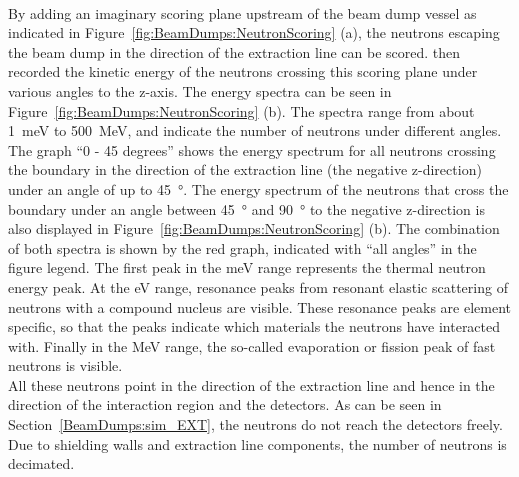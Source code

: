 \\By adding an imaginary scoring plane upstream of the beam dump vessel as indicated in Figure~\ref{fig:BeamDumps:NeutronScoring} (a), the neutrons escaping the beam dump in the direction of the extraction line can be scored.
\fluka then recorded the kinetic energy of the neutrons crossing this scoring plane under various angles to the z-axis.
The energy spectra can be seen in Figure~\ref{fig:BeamDumps:NeutronScoring} (b).
The spectra range from about \SI{1}{\meV} to \SI{500}{\MeV}, and indicate the number of neutrons under different angles. 
The graph ``0 - 45 degrees'' shows the energy spectrum for all neutrons crossing the boundary in the direction of the extraction line (the negative z-direction) under an angle of up to \SI{45}{\degree}.
The energy spectrum of the neutrons that cross the boundary under an angle between \SI{45}{\degree} and \SI{90}{\degree} to the negative z-direction is also displayed in Figure~\ref{fig:BeamDumps:NeutronScoring} (b).
The combination of both spectra is shown by the red graph, indicated with ``all angles'' in the figure legend.
The first peak in the meV range represents the thermal neutron energy peak.
At the eV range, resonance peaks from resonant elastic scattering of neutrons with a compound nucleus are visible.
These resonance peaks are element specific, so that the peaks indicate which materials the neutrons have interacted with.  %
Finally in the MeV range, the so-called evaporation or fission peak of fast neutrons is visible.
\\All these neutrons point in the direction of the extraction line and hence in the direction of the interaction region and the detectors.
As can be seen in Section~\ref{BeamDumps:sim_EXT}, the neutrons do not reach the detectors freely.
Due to shielding walls and extraction line components, the number of neutrons is decimated.
